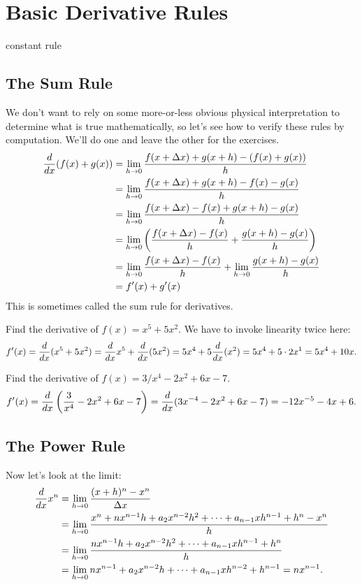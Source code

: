 \section{Basic Derivative Rules}

constant rule


\subsection{The Sum Rule}

We don't want to rely on some more-or-less obvious physical
interpretation to determine what is true mathematically, so let's see
how to verify these rules by computation. We'll do one and leave the
other for the exercises.
\begin{align*}
\frac{d}{dx}(f(x)+g(x)) &= \lim_{ h\to 0} {f(x+\Delta
  x)+g(x+ h) - (f(x)+g(x))\over  h}  \\
&= \lim_{ h\to 0} {f(x+\Delta
  x)+g(x+ h) - f(x)-g(x)\over  h}  \\
&= \lim_{ h\to 0} {f(x+\Delta
  x)-f(x) +g(x+ h) -g(x)\over  h}  \\
&= \lim_{ h\to 0} \left({f(x+\Delta
  x)-f(x)\over  h}  +{g(x+ h) -g(x)\over  h}\right)  \\
&= \lim_{ h\to 0} {f(x+\Delta
  x)-f(x)\over  h}  +
\lim_{ h\to 0} {g(x+ h) -g(x)\over  h}  \\
&=f'(x)+g'(x) \\
\end{align*}
This is sometimes called the {\dfont sum rule} for derivatives.
\begin{example}
Find the derivative of $f(x)=x^5+5x^2$. We have to invoke linearity
twice here: 
\[
f'(x) = \frac{d}{dx}(x^5+5x^2) = \frac{d}{dx} x^5 + \frac{d}{dx}(5x^2) =
5x^4+5\frac{d}{dx}(x^2) = 5x^4+5\cdot 2x^1 = 5x^4+10x.
\]
\vskip-10pt\end{example}

\begin{example}
Find the derivative of $f(x)=3/x^4-2x^2+6x-7$.
$$f'(x) = \frac{d}{dx}\left( {3\over x^4}-2x^2+6x-7\right)
= \frac{d}{dx}(3x^{-4}-2x^2+6x-7) 
= -12x^{-5}-4x+6.$$
\vskip-10pt\end{example}




\subsection{The Power Rule}

 Now
let's look at the limit:
\begin{align*}
\frac{d}{dx} x^n &= \lim_{ h\to0} {(x+ h)^n-x^n\over \Delta
  x} \\
&=\lim_{ h\to0} {x^n + nx^{n-1} h + a_2x^{n-2} h^2+\cdots+
a_{n-1}x h^{n-1} +  h^n-x^n\over  h} \\
&=\lim_{ h\to0} {nx^{n-1} h + a_2x^{n-2} h^2+\cdots+
a_{n-1}x h^{n-1} +  h^n\over  h} \\
&=\lim_{ h\to0} nx^{n-1} + a_2x^{n-2} h+\cdots+
a_{n-1}x h^{n-2} +  h^{n-1} = nx^{n-1}. \\
\end{align*}

